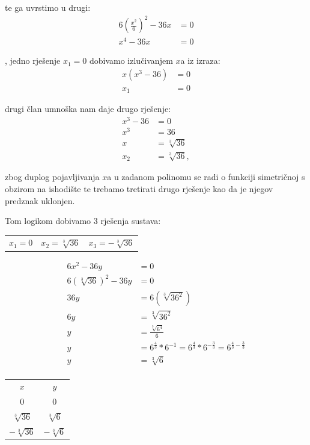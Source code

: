 \documentclass[12pt,a4paper]{report}
\begin{document}
te ga uvrstimo u drugi:
\begin{align*}
    6(\frac{x^2}{6})^2 - 36x & = 0 \\
    x^4 - 36x & = 0
\end{align*}

, jedno rješenje $x_1 = 0$ dobivamo izlučivanjem $x$a iz izraza:
\begin{align*}
    x(x^3 - 36) &= 0 \\
    x_1 &= 0
\end{align*}

drugi član umnoška nam daje drugo rješenje:
\begin{align*}
    x^3 - 36 &= 0 \\
    x^3 &= 36 \\
    x &= \sqrt[3]{36} \\
    x_2 &= \sqrt[3]{36},
\end{align*}

zbog duplog pojavljivanja $x$a u zadanom polinomu se radi o funkciji simetričnoj s obzirom na ishodište te trebamo tretirati drugo rješenje kao da je njegov predznak uklonjen.

Tom logikom dobivamo 3 rješenja sustava:
\begin{center}
\begin{tabular}{c c c}
    $x_1 = 0$ & $x_2 = \sqrt[3]{36}$ & $x_3 = -\sqrt[3]{36}$\\
\end{tabular}
\end{center}

\begin{align*}
    6x^2 - 36y &= 0\\
    6(\sqrt[3]{36})^2 - 36y &= 0\\
    36y &= 6(\sqrt[3]{36^2})\\
    6y &= \sqrt[3]{36^2} \\
    y &= \frac{\sqrt[3]{6^4}}{6} \\
    y &= 6^{\frac{4}{3}} * 6^{-1} = 6^{\frac{4}{3}} * 6^{-\frac{3}{3}} = 6^{\frac{4}{3} - \frac{3}{3}} \\
    y &= \sqrt[3]6 \\
\end{align*}

\begin{center}
\begin{tabular}{c c}
    $x$ & $y$ \\
    $0$ & $0$ \\
    $\sqrt[3]{36}$ & $\sqrt[3]6$ \\
    $-\sqrt[3]{36}$ & $-\sqrt[3]6$ \\
\end{tabular}
\end{center}
\end{document}
